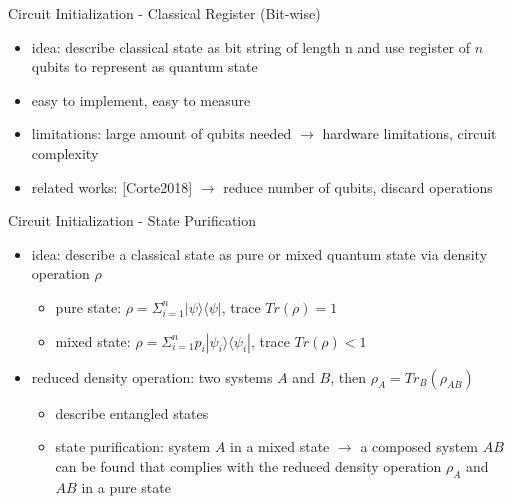 \begin{frame}[title-small={color=hpiorange, bg=none, text=Implementation}]
	\maketitle
\end{frame}


\begin{frame}{Circuit Initialization - Classical Register (Bit-wise)}
  \begin{minipage}{1.0\textwidth}
    \begin{itemize}
      \item idea: describe classical state as bit string of length n and use register of $n$ qubits to represent as quantum state
      \item easy to implement, easy to measure
      \item limitations: large amount of qubits needed $\rightarrow$ hardware limitations, circuit complexity
      \item related works: [Corte2018] $\rightarrow$ reduce number of qubits, discard operations
    \end{itemize}
  \end{minipage}
\end{frame}


\begin{frame}{Circuit Initialization - State Purification}
  \begin{minipage}{1.0\textwidth}
    \begin{itemize}
      \item idea: describe a classical state as pure or mixed quantum state via density operation $\rho$
      \begin{itemize}
        \item pure state: $\rho = \Sigma_{i=1}^{n} |\psi\rangle \langle\psi |$, trace $Tr(\rho) = 1$
        \item mixed state: $\rho = \Sigma_{i=1}^{n} p_i |\psi_i\rangle \langle\psi_i |$, trace $Tr(\rho) < 1$
      \end{itemize}
      \item reduced density operation: two systems $A$ and $B$, then $\rho_{A} = Tr_B(\rho_{AB})$
      \begin{itemize}
        \item describe entangled states
        \item state purification: system $A$ in a mixed state $\rightarrow$ a composed system $AB$ can be found that complies with the reduced density operation $\rho_{A}$ and $AB$ in a pure state
      \end{itemize}
    \end{itemize}
  \end{minipage}
\end{frame}


